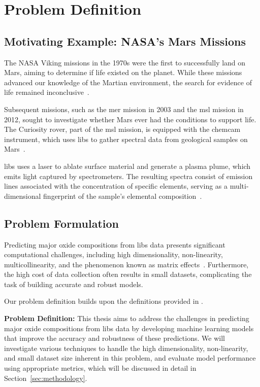 \section{Problem Definition}\label{sec:problem_definition}

\subsection{Motivating Example: NASA's Mars Missions}
The NASA Viking missions in the 1970s were the first to successfully land on Mars, aiming to determine if life existed on the planet. 
While these missions advanced our knowledge of the Martian environment, the search for evidence of life remained inconclusive~\cite{marsnasagov_vikings}.

Subsequent missions, such as the \gls{mer} mission in 2003 and the \gls{msl} mission in 2012, sought to investigate whether Mars ever had the conditions to support life. 
The Curiosity rover, part of the \gls{msl} mission, is equipped with the \gls{chemcam} instrument, which uses \gls{libs} to gather spectral data from geological samples on Mars~\cite{wiensChemcam2012}.

\gls{libs} uses a laser to ablate surface material and generate a plasma plume, which emits light captured by spectrometers. 
The resulting spectra consist of emission lines associated with the concentration of specific elements, serving as a multi-dimensional fingerprint of the sample's elemental composition~\cite{cleggRecalibrationMarsScience2017}.

\subsection{Problem Formulation}
Predicting major oxide compositions from \gls{libs} data presents significant computational challenges, including high dimensionality, non-linearity, multicollinearity, and the phenomenon known as matrix effects~\cite{andersonImprovedAccuracyQuantitative2017}.
Furthermore, the high cost of data collection often results in small datasets, complicating the task of building accurate and robust models.

Our problem definition builds upon the definitions provided in \citet{p9_paper}.


\textbf{Problem Definition:} This thesis aims to address the challenges in predicting major oxide compositions from \gls{libs} data by developing machine learning models that improve the accuracy and robustness of these predictions. 
We will investigate various techniques to handle the high dimensionality, non-linearity, and small dataset size inherent in this problem, and evaluate model performance using appropriate metrics, which will be discussed in detail in Section~\ref{sec:methodology}.

